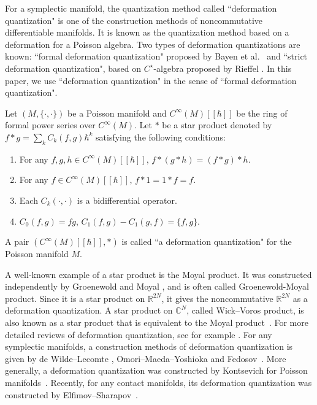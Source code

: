 \documentclass[pdftex]{sigma}
\numberwithin{equation}{section}
\begin{document}
For a symplectic manifold, the quantization method called ``deformation quantization" is one of the construction methods of noncommutative differentiable manifolds. It is known as the quantization method based on a deformation for a Poisson algebra. Two types of deformation quantizations are known: ``formal deformation quantization" proposed by Bayen et al.~\cite{BFFLS} and ``strict deformation quantization", based on $C^{\star}$-algebra proposed by Rieffel \cite{Rief1,Rief2,Rief3}. In this paper, we use ``deformation quantization" in the sense of ``formal deformation quantization".
\begin{Definition}\label{dq_def}
 Let
 $
 (
 M,
 \{
 \cdot,
 \cdot
 \}
 )
 $
 be a Poisson manifold and
 $
 C^{\infty}
 (M)
 [\!
 [
 \hbar
 ]
 \!]
 $
 be the ring of formal power series over
 $
 C^{\infty}(M).
 $ Let $\ast$ be a star product denoted by
 $
 f
 \ast
 g
 =
 \sum_{k}
 C_{k} (f,g )
 \hbar^{k}
 $
 satisfying the following conditions:
 \begin{enumerate}\itemsep=0pt
 \item[(1)]
 For any
 $ f,g,h \in C^{\infty} (M)[\![ \hbar] \!]$, $ f \ast( g \ast h) = ( f \ast g) \ast h$.
 \item[(2)]
 For any
 $
 f
 \in
 C^{\infty}
 (M)
 [\!
 [
 \hbar
 ]
 \!]
 $,
 $
 f
 \ast
 1
 =
 1
 \ast
 f
 =
 f.
 $
 \item[(3)]
 Each $C_{k}(\cdot,\cdot)$ is a bidifferential operator.

 \item[(4)]
 $
 C_{0}
 (
 f,
 g
 )
 =
 fg$,
 $
 C_{1}
 (
 f,
 g
 )
 -
 C_{1}
 (
 g,
 f
 )
 =
 \{f,g\} $.
 \end{enumerate}
 A pair
 $
 (
 C^{\infty}
 (M)
 [\!
 [
 \hbar
 ]
 \!],
 \ast
 )
 $
 is called ``a deformation quantization" for the Poisson manifold $M$.
\end{Definition}

A well-known example of a star product is the Moyal product. It was constructed independently by Groenewold \cite{Groe} and Moyal \cite{Moya}, and is often called Groenewold-Moyal product. Since it is a star product on $\mathbb{R}^{2N}$, it gives the noncommutative $\mathbb{R}^{2N}$ as a deformation quantization. A star product on $\mathbb{C}^{N}$, called Wick--Voros product, is also known as a star product that is equivalent to the Moyal product~\cite{Voro}. For more detailed reviews of deformation quantization, see for example \cite{GUT,Mosha}. For any symplectic manifolds, a construction methods of deformation quantization is given by de Wilde--Lecomte \cite{DL}, Omori--Maeda--Yoshioka \cite{OMY1} and Fedosov~\cite{Fedo}. More generally, a deformation quantization was constructed by Kontsevich for Poisson manifolds~\cite{Kont1}. Recently, for any contact manifolds, its deformation quantization was constructed by Elfimov--Sharapov~\cite{ES}.
\end{document}
